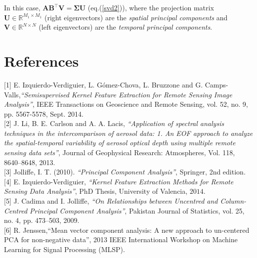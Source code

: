 \documentclass{article}
\def\A{{\mathbf A}}
\def\B{{\mathbf B}}
\def\U{{\mathbf U}}
\def\V{{\mathbf V}}
\def\R{\mathbb{R}}
\begin{document}
In this case, $\A\B^{\top} \V =\boldsymbol{\Sigma} \U$ (eq.(\ref{svd2})), where the projection matrix $\U \in \R^{M_1 \times M_1}$ (right eigenvectors) are the {\em spatial principal components} and $\V \in \R^{N \times N}$ (left eigenvectors) are the {\em temporal principal components}.




\section*{References}
\small{[1] E. Izquierdo-Verdiguier, L. Gómez-Chova, L. Bruzzone and G. Camps-Valls,{\em ``Semisupervised Kernel Feature Extraction for Remote Sensing Image Analysis''}, IEEE Transactions on Geoscience and Remote Sensing, vol. 52, no. 9, pp. 5567-5578, Sept. 2014.}\\

\small{[2] J. Li, B. E. Carlson and A. A. Lacis, {\em ``Application of spectral analysis techniques in the intercomparison of aerosol data: 1. An EOF approach to analyze the spatial-temporal variability of aerosol optical depth using multiple remote sensing data sets''}, Journal of Geophysical Research: Atmospheres, Vol. 118, 8640–8648, 2013.}\\

\small{[3] Jolliffe, I. T. (2010). {\em ``Principal Component Analysis''}, Springer, 2nd edition.}\\

\small{[4] E. Izquierdo-Verdiguier, {\em  ``Kernel Feature Extraction Methods for Remote Sensing Data Analysis''}, PhD Thesis, University of Valencia, $2014$.}\\

\small{[5] J. Cadima and I. Jolliffe, {\em  ``On Relationships between Uncentred and Column-Centred Principal Component Analysis''}, Pakistan Journal of Statistics, vol. 25, no. 4, pp. 473–503, 2009.}\\

\small{[6] R. Jenssen,{``Mean vector component analysis: A new approach to un-centered PCA for non-negative data''}, 2013 IEEE International Workshop on Machine Learning for Signal Processing (MLSP).}
\end{document}

